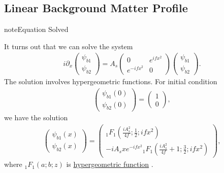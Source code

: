 \documentclass[letterpaper,12pt,english]{sphinxmanual}
\begin{document}
\subsection{Linear Background Matter Profile}
\label{\detokenize{matter-stimulated/linear-background-matter:id1}}
\begin{sphinxadmonition}{note}{Equation Solved}

It turns out that we can solve the system
\begin{equation*}
\begin{split}i\partial_x \begin{pmatrix}
\psi_{b1}\\
\psi_{b2}
\end{pmatrix} = A_s  \begin{pmatrix}
0 & e^{if x^2} \\
e^{-if x^2} & 0
\end{pmatrix}\begin{pmatrix}
\psi_{b1}\\
\psi_{b2}
\end{pmatrix}.\end{split}
\end{equation*}
The solution involves hypergeometric functions. For initial condition
\begin{equation*}
\begin{split}\begin{pmatrix}
\psi_{b1}(0)\\
\psi_{b2}(0)
\end{pmatrix} = \begin{pmatrix}
1\\
0
\end{pmatrix},\end{split}
\end{equation*}
we have the solution
\begin{equation*}
\begin{split}\begin{pmatrix}
\psi_{b1}(x)\\
\psi_{b2}(x)
\end{pmatrix} = \begin{pmatrix}
{}_1F_1 \left( \frac{i A_s^2}{4f};\frac{1}{2}; i f x^2 \right) \\
-i A_s x e^{-i f x^2} {}_1F_1 \left( \frac{i A_s^2}{4f}+1;\frac{3}{2}; i f x^2 \right)
\end{pmatrix},\end{split}
\end{equation*}
where \({}_1F_1(a;b;z)\) is \href{https://en.wikipedia.org/wiki/Confluent\_hypergeometric\_function}{hypergeometric function} .
\end{sphinxadmonition}
\end{document}
